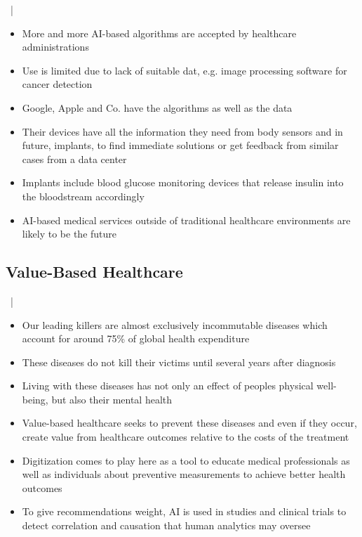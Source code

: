 \documentclass[xcolor=dvipsnames, aspectratio=1610]{beamer}
\begin{document}
\begin{frame}{\secname\ | \subsecname}
    \begin{itemize}[<+->]
        \item More and more AI-based algorithms are accepted by healthcare administrations
        \item Use is limited due to lack of suitable dat, e.g. image processing software for cancer detection
        \item Google, Apple and Co. have the algorithms as well as the data
        \item Their devices have all the information they need from body sensors and in future, implants, to find immediate solutions or get feedback from similar cases from a data center
        \item Implants include blood glucose monitoring devices that release insulin into the bloodstream accordingly
        \item AI-based medical services outside of traditional healthcare environments are likely to be the future
    \end{itemize}
\end{frame}

\subsection{Value-Based Healthcare}%
\label{sub:value_based_healthcare}

\begin{frame}{\secname\ | \subsecname}
    \begin{itemize}[<+->]
        \item Our leading killers are almost exclusively incommutable diseases which account for around 75\% of global health expenditure
        \item These diseases do not kill their victims until several years after diagnosis
        \item Living with these diseases has not only an effect of peoples physical well-being, but also their mental health
        \item Value-based healthcare seeks to prevent these diseases and even if they occur, create value from healthcare outcomes relative to the costs of the treatment
        \item Digitization comes to play here as a tool to educate medical professionals as well as individuals about preventive measurements to achieve better health outcomes
        \item To give recommendations weight, AI is used in studies and clinical trials to detect correlation and causation that human analytics may oversee
    \end{itemize}
\end{frame}
\end{document}
